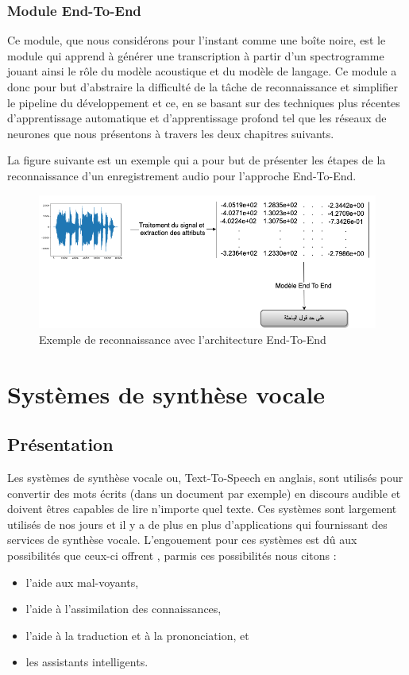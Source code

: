 \subsubsection{Module End-To-End}
Ce module, que nous considérons pour l'instant comme une boîte noire, est le module qui apprend à générer une transcription à partir d'un spectrogramme jouant ainsi le rôle du modèle acoustique et du modèle de langage. Ce module a donc pour but d'abstraire la difficulté de la tâche de reconnaissance et simplifier le pipeline du développement et ce, en se basant sur des techniques plus récentes d'apprentissage automatique et d'apprentissage profond tel que les réseaux de neurones que nous présentons à travers les deux chapitres suivants.

La figure suivante est un exemple qui a pour but de présenter les étapes de la reconnaissance d'un enregistrement audio pour l'approche End-To-End.

\begin{figure}[H]
    \centering
    \includegraphics[width=400pt]{images/chap1/Exemple_archi_end2end.png}
    \caption{Exemple de reconnaissance avec l'architecture End-To-End}
    \label{explASRE2E}
\end{figure}


\section{Systèmes de synthèse vocale}
\subsection{Présentation}
Les systèmes de synthèse vocale ou, Text-To-Speech en anglais, sont utilisés pour convertir des mots écrits (dans un document par exemple) en discours audible et doivent êtres capables de lire n'importe quel texte.
Ces systèmes sont largement utilisés de nos jours et il y a de plus en plus d'applications qui fournissant des services de synthèse vocale. L'engouement pour ces systèmes est dû aux possibilités que ceux-ci offrent \cite{ttsuse}, parmis ces possibilités nous citons : 
\begin{itemize}
    \item l'aide aux mal-voyants,
    \item l'aide à l'assimilation des connaissances, 
    \item l'aide à la traduction et à la prononciation, et
    \item les assistants intelligents. \\
\end{itemize}

